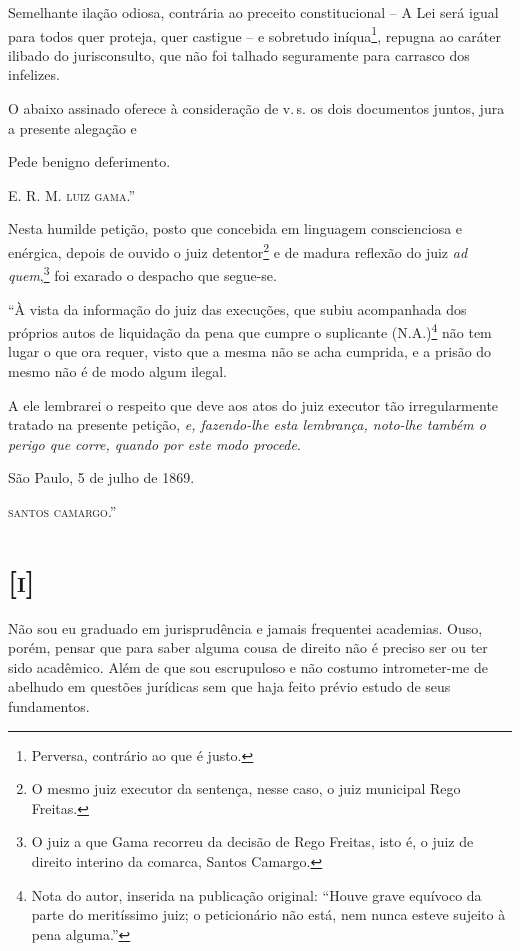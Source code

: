 Semelhante ilação odiosa, contrária ao preceito constitucional -- A Lei
será igual para todos quer proteja, quer castigue -- e sobretudo
iníqua\footnote{Perversa, contrário ao que é justo.}, repugna ao
caráter ilibado do jurisconsulto, que não foi talhado seguramente para
carrasco dos infelizes.

O abaixo assinado oferece à consideração de v.\,s. os dois documentos
juntos, jura a presente alegação e

\begin{flushright}
Pede benigno deferimento.

E. R. M.
\textsc{luiz gama}.''
\end{flushright}

Nesta humilde petição, posto que concebida em linguagem conscienciosa e
enérgica, depois de ouvido o juiz detentor\footnote{O mesmo juiz
  executor da sentença, nesse caso, o juiz municipal Rego Freitas.} e de
madura reflexão do juiz \emph{ad quem},\footnote{O juiz a que Gama
  recorreu da decisão de Rego Freitas, isto é, o juiz de direito
  interino da comarca, Santos Camargo.} foi exarado o despacho que
segue-se.

``À vista da informação do juiz das execuções, que subiu acompanhada dos
próprios autos de liquidação da pena que cumpre o suplicante
(N.A.)\footnote{Nota do autor, inserida na publicação original: ``Houve
  grave equívoco da parte do meritíssimo juiz; o peticionário não está,
  nem nunca esteve sujeito à pena alguma.''} não tem lugar o que ora
requer, visto que a mesma não se acha cumprida, e a prisão do mesmo não
é de modo algum ilegal.

A ele lembrarei o respeito que deve aos atos do juiz executor tão
irregularmente tratado na presente petição, \emph{e, fazendo-lhe esta
lembrança, noto-lhe também o perigo que corre, quando por este modo
procede}.
\begin{flushright}
São Paulo, 5 de julho de 1869.

\textsc{santos camargo}.''
\end{flushright}
\section{{[}\textsc{i}{]}}

Não sou eu graduado em jurisprudência e jamais frequentei academias.
Ouso, porém, pensar que para saber alguma cousa de direito não é preciso
ser ou ter sido acadêmico. Além de que sou escrupuloso e não costumo
intrometer-me de abelhudo em questões jurídicas sem que haja feito
prévio estudo de seus fundamentos.

